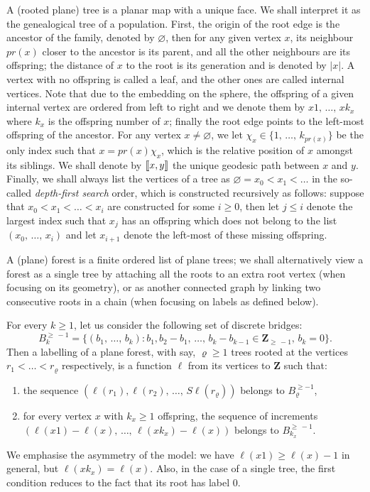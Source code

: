 \documentclass[10pt]{amsart}
\theoremstyle{definition}\newtheorem{defi}[theo]{Definition}\newtheorem{rema}[theo]{Remark}\newtheorem{exam}[theo]{Example}\newtheorem{exem}[theo]{Example}\newtheorem{nota}[theo]{Notation}
\newcommand{\llbracket}{\mathopen{[\mkern -2.7mu[}}
\newcommand{\rrbracket}{\mathclose{]\mkern -2.7mu]}}
\newcommand{\ensembles}[1]{\mathbf{#1}}
\newcommand{\Z}{\ensembles{Z}}
\newcommand{\1}{\ensembles{1}}
\renewcommand{\le}{\leqslant}
\renewcommand{\ge}{\geqslant}
\newcommand{\BBmap}{B}
\providecommand{\?}{}
\begin{document}
A (rooted plane) tree is a planar map with a unique face. We shall interpret it as the genealogical tree of a population. First, the origin of the root edge is the ancestor of the family, denoted by $\varnothing$, then for any given vertex $x$, its neighbour $pr(x)$ closer to the ancestor is its parent, and all the other neighbours are its offspring; the distance of $x$ to the root is its generation and is denoted by $|x|$. A vertex with no offspring is called a leaf, and the other ones are called internal vertices. Note that due to the embedding on the sphere, the offspring of a given internal vertex are ordered from left to right and we denote them by $x1,\,\dots,\,xk_x$ where $k_x$ is the offspring number of $x$; finally the root edge points to the left-most offspring of the ancestor. For any vertex $x \ne \varnothing$, we let $\chi_x \in \{1,\,\dots, \,k_{pr(x)}\}$ be the only index such that $x=pr(x) \chi_x$, which is the relative position of $x$ amongst its siblings. We shall denote by $\llbracket x, y \rrbracket$ the unique geodesic path between $x$ and $y$. Finally, we shall always list the vertices of a tree as $\varnothing = x_0 < x_1 < \dots$ in the so-called \emph{depth-first search} order, which is constructed recursively as follows: suppose that $x_0 < x_1 < \dots < x_i$ are constructed for some $i\ge 0$, then let $j \le i$ denote the largest index such that $x_j$ has an offspring which does not belong to the list $(x_0,\,\dots,\,x_i)$ and let $x_{i+1}$ denote the left-most of these missing offspring.


A (plane) forest is a finite ordered list of plane trees; we shall alternatively view a forest as a single tree by attaching all the roots to an extra root vertex (when focusing on its geometry), or as another connected graph by linking two consecutive roots in a chain (when focusing on labels as defined below).

For every $k \ge 1$, let us consider the following set of discrete bridges:
\begin{equation}\label{eq:def_pont}
\BBmap_k^{\ge\,-1} = \big\{(b_1,\,\dots,\, b_k): b_1, b_2-b_1,\,\dots,\,b_k-b_{k-1} \in \Z_{\ge\,-1},\, b_k=0\big\}.
\end{equation}
Then a labelling of a plane forest, with say, $\varrho \ge 1$ trees rooted at the vertices $r_1 < \dots < r_\varrho$ respectively, is a function $\ell$ from its vertices to $\Z$ such that:
\begin{enumerate}
\item the sequence $(\ell(r_1), \ell(r_2),\, \dots,\,S\ell(r_\varrho))$ belongs to $\BBmap_{\varrho}^{\ge -1}$,
\item for every vertex $x$ with $k_x \ge 1$ offspring, the sequence of increments $(\ell(x1)-\ell(x),\,\dots,\,\ell(xk_x)-\ell(x))$ belongs to $\BBmap_{k_x}^{\ge\, -1}$.
\end{enumerate}
We emphasise the asymmetry of the model: we have $\ell(x1) \ge \ell(x)-1$ in general, but $\ell(xk_x)=\ell(x)$. Also, in the case of a single tree, the first condition reduces to the fact that its root has label $0$.
\end{document}
